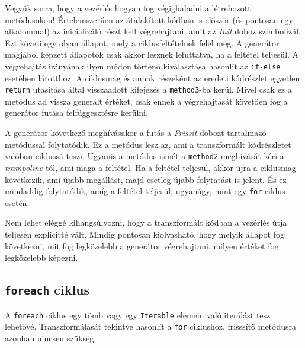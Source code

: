 Vegyük sorra, hogy a vezérlés hogyan fog végighaladni a létrehozott metódusokon! Értelemszerűen az átalakított kódban is először (és pontosan egy alkalommal) az inicializáló részt kell végrehajtani, amit az \textit{Init} doboz szimbolizál. Ezt követi egy olyan állapot, mely a ciklusfeltételnek felel meg. A generátor magjából képzett állapotok csak akkor lesznek lefuttatva, ha a feltétel teljesül. A végrehajtás irányának ilyen módon történő kiválasztása hasonlít az \texttt{if-else} esetében látotthoz. A ciklusmag és annak részeként az eredeti kódrészlet egyetlen \texttt{return} utasítása által visszaadott kifejezés a \texttt{method3}-ba kerül. Mivel csak ez a metódus ad vissza generált értéket, csak ennek a végrehajtását követően fog a generátor futása felfüggesztésre kerülni. 

A generátor következő meghívásakor a futás a \textit{Frissít} dobozt tartalmazó metódussal folytatódik. Ez a metódus lesz az, ami a transzformált kódrészletet valóban ciklussá teszi. Ugyanis a metódus ismét a \texttt{method2} meghívását kéri a \textit{trampoline}-tól, ami maga a feltétel. Ha a feltétel teljesül, akkor újra a ciklusmag következik, ami újabb megállást, majd esetleg újabb folytatást is jelent. És ez mindaddig folytatódik, amíg a feltétel teljesül, ugyanúgy, mint egy \texttt{for} ciklus esetén.

Nem lehet eléggé kihangsúlyozni, hogy a transzformált kódban a vezérlés útja teljesen explicitté vált. Mindig pontosan kiolvasható, hogy melyik állapot fog következni, mit fog legközelebb a generátor végrehajtani, milyen értéket fog legközelebb képezni.

\subsection{\texttt{foreach} ciklus}

A \texttt{foreach} ciklus egy tömb vagy egy \texttt{Iterable} elemein való iterálást tesz lehetővé. Transzformálását tekintve hasonlít a \texttt{for} ciklushoz, frisssítő metódusra azonban nincsen szükség.

